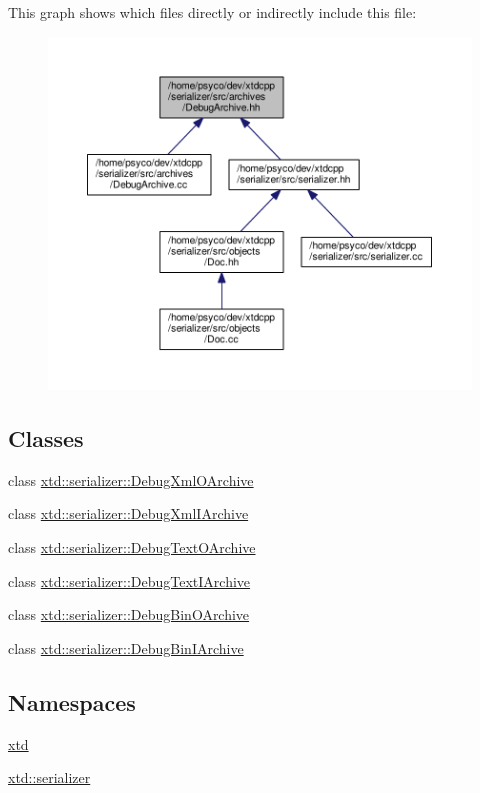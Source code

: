 This graph shows which files directly or indirectly include this file\+:
\nopagebreak
\begin{figure}[H]
\begin{center}
\leavevmode
\includegraphics[width=350pt]{DebugArchive_8hh__dep__incl}
\end{center}
\end{figure}
\subsection*{Classes}
\begin{DoxyCompactItemize}
\item 
class \hyperlink{classxtd_1_1serializer_1_1DebugXmlOArchive}{xtd\+::serializer\+::\+Debug\+Xml\+O\+Archive}
\item 
class \hyperlink{classxtd_1_1serializer_1_1DebugXmlIArchive}{xtd\+::serializer\+::\+Debug\+Xml\+I\+Archive}
\item 
class \hyperlink{classxtd_1_1serializer_1_1DebugTextOArchive}{xtd\+::serializer\+::\+Debug\+Text\+O\+Archive}
\item 
class \hyperlink{classxtd_1_1serializer_1_1DebugTextIArchive}{xtd\+::serializer\+::\+Debug\+Text\+I\+Archive}
\item 
class \hyperlink{classxtd_1_1serializer_1_1DebugBinOArchive}{xtd\+::serializer\+::\+Debug\+Bin\+O\+Archive}
\item 
class \hyperlink{classxtd_1_1serializer_1_1DebugBinIArchive}{xtd\+::serializer\+::\+Debug\+Bin\+I\+Archive}
\end{DoxyCompactItemize}
\subsection*{Namespaces}
\begin{DoxyCompactItemize}
\item 
 \hyperlink{namespacextd}{xtd}
\item 
 \hyperlink{namespacextd_1_1serializer}{xtd\+::serializer}
\end{DoxyCompactItemize}

